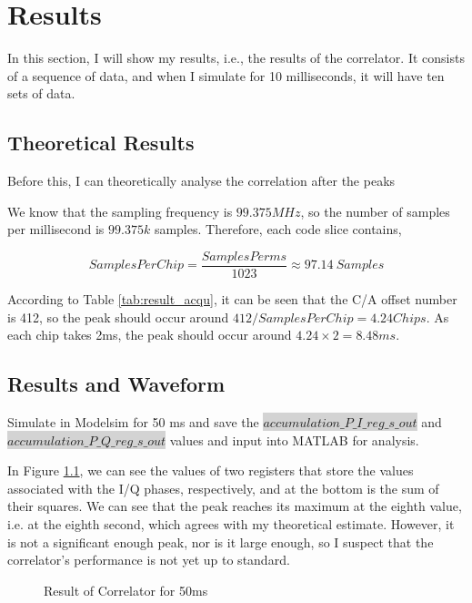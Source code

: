 \myClearDoublePage
\chapter{Results}
In this section, I will show my results, i.e., the results of the correlator. It consists of a sequence of data, and when I simulate for 10 milliseconds, it will have ten sets of data.

\section{Theoretical Results}
Before this, I can theoretically analyse the correlation after the peaks

We know that the sampling frequency is $99.375MHz$, so the number of samples per millisecond is $99.375k$ samples. Therefore, each code slice contains,

\begin{equation}
    SamplesPerChip=\frac{SamplesPerms}{1023} \approx 97.14\ Samples
\end{equation}

According to Table \ref{tab:result_acqu}, it can be seen that the C/A offset number is 412, so the peak should occur around $412/SamplesPerChip=4.24Chips$. As each chip takes 2ms, the peak should occur around $4.24\times 2=8.48ms$.

\section{Results and Waveform}
\label{sec:results_waveform}
Simulate in Modelsim for 50 ms and save the \colorbox{lightgray}{$accumulation\_P\_I\_reg\_s\_out$} and\\ \colorbox{lightgray}{$accumulation\_P\_Q\_reg\_s\_out$} values and input into MATLAB for analysis.

In Figure \ref{fig:result_50}, we can see the values of two registers that store the values associated with the I/Q phases, respectively, and at the bottom is the sum of their squares. We can see that the peak reaches its maximum at the eighth value, i.e. at the eighth second, which agrees with my theoretical estimate. However, it is not a significant enough peak, nor is it large enough, so I suspect that the correlator's performance is not yet up to standard.

\begin{figure}[!htbp]
    \centering
    
    \caption{Result of Correlator for 50ms}
    \label{fig:result_50}
\end{figure}
